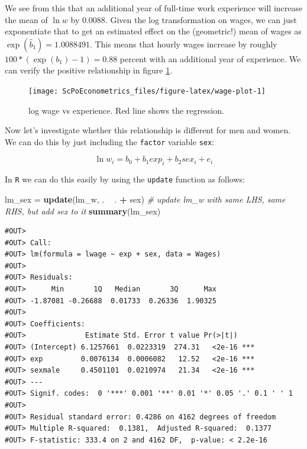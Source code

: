 \documentclass[]{book}
\newenvironment{Shaded}{\begin{snugshade}}{\end{snugshade}}
\newcommand{\KeywordTok}[1]{\textcolor[rgb]{0.13,0.29,0.53}{\textbf{#1}}}
\newcommand{\StringTok}[1]{\textcolor[rgb]{0.31,0.60,0.02}{#1}}
\newcommand{\CommentTok}[1]{\textcolor[rgb]{0.56,0.35,0.01}{\textit{#1}}}
\newcommand{\OperatorTok}[1]{\textcolor[rgb]{0.81,0.36,0.00}{\textbf{#1}}}
\newcommand{\NormalTok}[1]{#1}
\theoremstyle{definition}
\theoremstyle{definition}
\theoremstyle{definition}
\theoremstyle{remark}
\begin{document}
We see from this that an additional year of full-time work experience
will increase the mean of \(\ln w\) by 0.0088. Given the log
transformation on wages, we can just exponentiate that to get an
estimated effect on the (geometric!) mean of wages as
\(\exp(\hat{b}_1) = 1.0088491\). This means that hourly wages increase
by roughly \(100 * (\exp(b_1)-1) = 0.88\) percent with an additional
year of experience. We can verify the positive relationship in figure
\ref{fig:wage-plot}.

\begin{figure}

{\centering \texttt{[image: ScPoEconometrics\_files/figure-latex/wage-plot-1]} 

}

\caption{log wage vs experience. Red line shows the regression.}\label{fig:wage-plot}
\end{figure}

Now let's investigate whether this relationship is different for men and
women. We can do this by just including the \texttt{factor} variable
\texttt{sex}:

\[
\ln w_i = b_0 + b_1 exp_i + b_2 sex_i + e_i \label{eq:wage-sex}
\]

In \texttt{R} we can do this easily by using the \texttt{update}
function as follows:

\begin{Shaded}
\begin{Highlighting}[]
\NormalTok{lm_sex =}\StringTok{ }\KeywordTok{update}\NormalTok{(lm_w, . }\OperatorTok{~}\StringTok{ }\NormalTok{. }\OperatorTok{+}\StringTok{ }\NormalTok{sex)  }\CommentTok{# update lm_w with same LHS, same RHS, but add sex to it}
\KeywordTok{summary}\NormalTok{(lm_sex)}
\end{Highlighting}
\end{Shaded}

\begin{verbatim}
#OUT> 
#OUT> Call:
#OUT> lm(formula = lwage ~ exp + sex, data = Wages)
#OUT> 
#OUT> Residuals:
#OUT>      Min       1Q   Median       3Q      Max 
#OUT> -1.87081 -0.26688  0.01733  0.26336  1.90325 
#OUT> 
#OUT> Coefficients:
#OUT>              Estimate Std. Error t value Pr(>|t|)    
#OUT> (Intercept) 6.1257661  0.0223319  274.31   <2e-16 ***
#OUT> exp         0.0076134  0.0006082   12.52   <2e-16 ***
#OUT> sexmale     0.4501101  0.0210974   21.34   <2e-16 ***
#OUT> ---
#OUT> Signif. codes:  0 '***' 0.001 '**' 0.01 '*' 0.05 '.' 0.1 ' ' 1
#OUT> 
#OUT> Residual standard error: 0.4286 on 4162 degrees of freedom
#OUT> Multiple R-squared:  0.1381,  Adjusted R-squared:  0.1377 
#OUT> F-statistic: 333.4 on 2 and 4162 DF,  p-value: < 2.2e-16
\end{verbatim}
\end{document}
